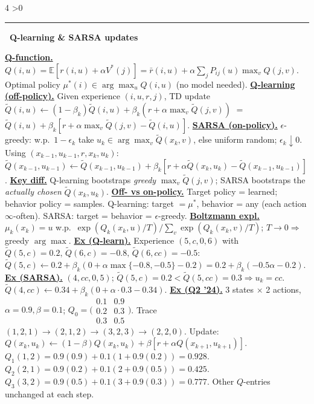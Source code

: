 \documentclass[10pt,landscape,letterpaper]{article}
\let\oldtextbf\textbf
\renewcommand{\textbf}[1]{\uline{\oldtextbf{#1}}}
\renewcommand{\section}[1]{%
  \ifnum\value{section}>0\par\vspace{1pt}\hrule\vspace{1pt}\fi
  \refstepcounter{section}\oldtextbf{\thesection\ #1}\ }
\begin{document}
\begin{multicols*}{4}
\section{Q-learning \& SARSA updates}

\textbf{Q-function.}
\(Q(i,u)=\mathbb{E}[r(i,u)+\alpha V^*(j)]=\bar r(i,u)+\alpha\!\sum_j\!P_{ij}(u)\max_v Q(j,v)\).
Optimal policy \(\mu^*(i)\in\arg\max_u Q(i,u)\) (no model needed).
\textbf{Q-learning (off-policy).} Given experience \((i,u,r,j)\), TD update \(\tilde Q(i,u)\!\leftarrow\!(1{-}\beta_k)\tilde Q(i,u)+\beta_k(r+\alpha\max_v\tilde Q(j,v))\) \(=\) \(\tilde Q(i,u)+\beta_k[r+\alpha\max_v\tilde Q(j,v)-\tilde Q(i,u)]\).
\textbf{SARSA (on-policy).} \(\epsilon\)-greedy: w.p.\ \(1{-}\epsilon_k\) take \(u_k\!\in\!\arg\max_v\tilde Q(x_k,v)\), else uniform random; \(\epsilon_k\!\downarrow\!0\).
Using \((x_{k-1},u_{k-1},r,x_k,u_k)\):
\(\tilde Q(x_{k-1},u_{k-1})\!\leftarrow\!\tilde Q(x_{k-1},u_{k-1})+\beta_k[r+\alpha\tilde Q(x_k,u_k)-\tilde Q(x_{k-1},u_{k-1})]\).
\textbf{Key diff.} Q-learning bootstraps \emph{greedy} \(\max_v\tilde Q(j,v)\);
SARSA bootstraps the \emph{actually chosen} \(\tilde Q(x_k,u_k)\).
\textbf{Off- vs on-policy.} Target policy = learned; behavior policy = samples.
Q-learning: target \(=\mu^*\), behavior = any (each action \(\infty\)-often).
SARSA: target = behavior = \(\epsilon\)-greedy.
\textbf{Boltzmann expl.} \(\mu_k(x_k){=}u\) w.p.\
\(\exp(Q_k(x_k,u)/T)/\!\sum_v\!\exp(Q_k(x_k,v)/T)\);
\(T\!\to\!0\Rightarrow\) greedy \(\arg\max\).
\textbf{Ex (Q-learn).} Experience \((5,c,0,6)\) with
\(\tilde Q(5,c){=}0.2,\,\tilde Q(6,c){=}{-}0.8,\,\tilde Q(6,cc){=}{-}0.5\):
\(\tilde Q(5,c)\leftarrow 0.2+\beta_k(0+\alpha\!\max\{-0.8,-0.5\}-0.2)=0.2+\beta_k(-0.5\alpha-0.2)\).
\textbf{Ex (SARSA).} \((4,cc,0,5)\); \(\tilde Q(5,c){=}0.2<\tilde Q(5,cc){=}0.3\Rightarrow u_k{=}cc\).
\(\tilde Q(4,cc)\leftarrow 0.34+\beta_k(0+\alpha\!\cdot\!0.3-0.34)\).
\textbf{Ex (Q2 '24).} 3 states \(\times\) 2 actions, \(\alpha{=}0.9,\beta{=}0.1\); \(Q_0{=}\bigl(\begin{smallmatrix}0.1&0.9\\0.2&0.3\\0.3&0.5\end{smallmatrix}\bigr)\).
Trace \((1,2,1)\!\to\!(2,1,2)\!\to\!(3,2,3)\!\to\!(2,2,0)\).
Update: \(Q(x_k,u_k){\leftarrow}(1{-}\beta)Q(x_k,u_k){+}\beta[r{+}\alpha Q(x_{k+1},u_{k+1})]\).
\(Q_1(1,2){=}0.9(0.9){+}0.1(1{+}0.9(0.2)){=}0.928\).
\(Q_2(2,1){=}0.9(0.2){+}0.1(2{+}0.9(0.5)){=}0.425\).
\(Q_3(3,2){=}0.9(0.5){+}0.1(3{+}0.9(0.3)){=}0.777\).
Other \(Q\)-entries unchanged at each step.


\end{multicols*}
\end{document}
